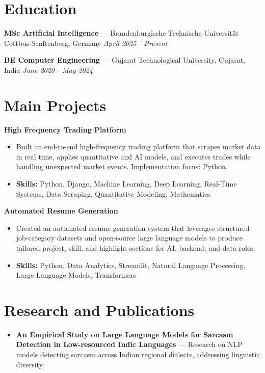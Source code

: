 \documentclass[a4paper,10pt]{article}
\begin{document}
\section*{Education}
\textbf{MSc Artificial Intelligence} — Brandenburgische Technische Universität Cottbus-Senftenberg, Germany \hfill \textit{April 2025 - Present}\par
\vspace{1.5pt}
\textbf{BE Computer Engineering} — Gujarat Technological University, Gujarat, India \hfill \textit{June 2020 - May 2024}\par

\section*{Main Projects}
\textbf{High Frequency Trading Platform}\par
\vspace{1pt}
\begin{itemize}
  \item Built an end-to-end high-frequency trading platform that scrapes market data in real time, applies quantitative and AI models, and executes trades while handling unexpected market events. Implementation focus: Python.
  \item \textbf{Skills:} Python, Django, Machine Learning, Deep Learning, Real-Time Systems, Data Scraping, Quantitative Modeling, Mathematics
\end{itemize}
\vspace{3pt}
\textbf{Automated Resume Generation}\par
\vspace{1pt}
\begin{itemize}
  \item Created an automated resume generation system that leverages structured job-category datasets and open-source large language models to produce tailored project, skill, and highlight sections for AI, backend, and data roles.
  \item \textbf{Skills:} Python, Data Analytics, Streamlit, Natural Language Processing, Large Language Models, Transformers
\end{itemize}

\section*{Research and Publications}
\begin{itemize}
\item \textbf{An Empirical Study on Large Language Models for Sarcasm Detection in Low-resourced Indic Languages} — Research on NLP models detecting sarcasm across Indian regional dialects, addressing linguistic diversity.
\end{itemize}
\end{document}
